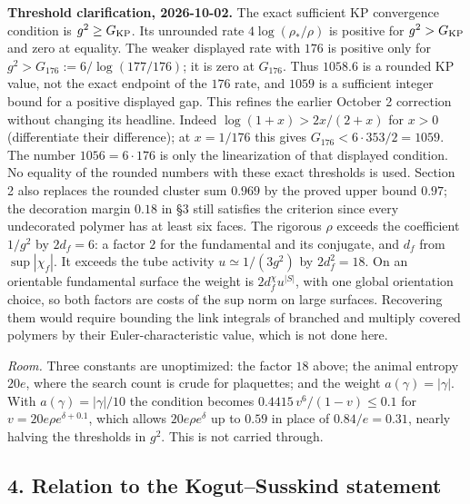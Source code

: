 \documentclass[11pt,a4paper]{article}
\begin{document}
\textbf{Threshold clarification, 2026-10-02.} The exact sufficient KP
convergence condition is \(g^2\ge G_{\rm KP}\). Its unrounded rate
\(4\log(\rho_*/\rho)\) is positive for \(g^2>G_{\rm KP}\) and zero at
equality. The weaker displayed rate with \(176\) is positive only for
\(g^2>G_{176}:=6/\log(177/176)\); it is zero at \(G_{176}\). Thus
\(1058.6\) is a rounded KP value, not the exact endpoint of the \(176\)
rate, and \(1059\) is a sufficient integer bound for a positive
displayed gap. This refines the earlier October 2 correction without
changing its headline. Indeed \(\log(1+x)>2x/(2+x)\) for \(x>0\)
(differentiate their difference); at \(x=1/176\) this gives
\(G_{176}<6\cdot353/2=1059\). The number \(1056=6\cdot176\) is only the
linearization of that displayed condition. No equality of the rounded
numbers with these exact thresholds is used. Section 2 also replaces the
rounded cluster sum \(0.969\) by the proved upper bound \(0.97\); the
decoration margin \(0.18\) in §3 still satisfies the criterion since
every undecorated polymer has at least six faces. The rigorous \(\rho\)
exceeds the coefficient \(1/g^2\) by \(2d_f=6\): a factor \(2\) for the
fundamental and its conjugate, and \(d_f\) from \(\sup|\chi_f|\). It
exceeds the tube activity \(u\simeq1/(3g^2)\) by \(2d_f^2=18\). On an
orientable fundamental surface the weight is \(2d_f^{\chi}u^{|S|}\),
with one global orientation choice, so both factors are costs of the sup
norm on large surfaces. Recovering them would require bounding the link
integrals of branched and multiply covered polymers by their
Euler-characteristic value, which is not done here.

\emph{Room.} Three constants are unoptimized: the factor \(18\) above;
the animal entropy \(20e\), where the search count is crude for
plaquettes; and the weight \(a(\gamma)=|\gamma|\). With
\(a(\gamma)=|\gamma|/10\) the condition becomes
\(0.4415\,v^6/(1-v)\le0.1\) for \(v=20e\rho e^{\delta+0.1}\), which
allows \(20e\rho e^{\delta}\) up to \(0.59\) in place of
\(0.84/e=0.31\), nearly halving the thresholds in \(g^2\). This is not
carried through.

\hypertarget{relation-to-the-kogutsusskind-statement}{%
\subsection{4. Relation to the Kogut--Susskind
statement}\label{relation-to-the-kogutsusskind-statement}}
\end{document}
